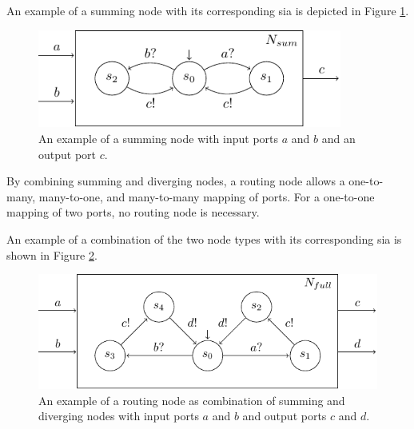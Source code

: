 An example of a summing node with its corresponding \gls{sia} is depicted in Figure \ref{fig_smx_fc_sum}.
\begin{figure}[bht]\begin{center}
\TopFigSpace
    \centering
    \includegraphics[width=10cm]{fig/sia_fc_sum.pdf}
    \CaptionFigSpace
    \caption{An example of a summing node with input ports $a$ and $b$ and an output port $c$.}
    \label{fig_smx_fc_sum}
\BotFigSpace
\end{center}\end{figure}

By combining summing and diverging nodes, a routing node allows a one-to-many, many-to-one, and many-to-many mapping of ports.
For a one-to-one mapping of two ports, no routing node is necessary.

An example of a combination of the two node types with its corresponding \gls{sia} is shown in Figure \ref{fig_smx_fc_full}.
\begin{figure}[bht]\begin{center}
\TopFigSpace
    \centering
    \includegraphics[width=12cm]{fig/sia_fc_full.pdf}
    \CaptionFigSpace
    \caption{An example of a routing node as combination of summing and diverging nodes with input ports $a$ and $b$ and output ports $c$ and $d$.}
    \label{fig_smx_fc_full}
\BotFigSpace
\end{center}\end{figure}


